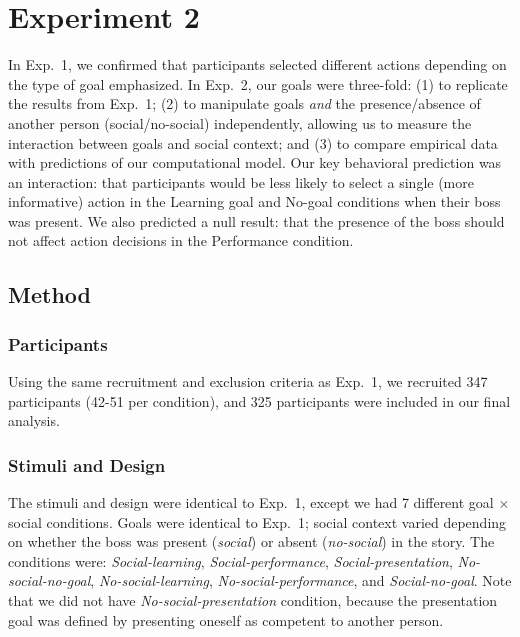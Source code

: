 \documentclass[10pt, letterpaper]{article}
\begin{document}
\section{Experiment 2}\label{experiment-2}

In Exp.~1, we confirmed that participants selected different actions
depending on the type of goal emphasized. In Exp.~2, our goals were
three-fold: (1) to replicate the results from Exp.~1; (2) to manipulate
goals \emph{and} the presence/absence of another person
(social/no-social) independently, allowing us to measure the interaction
between goals and social context; and (3) to compare empirical data with
predictions of our computational model. Our key behavioral prediction
was an interaction: that participants would be less likely to select a
single (more informative) action in the Learning goal and No-goal
conditions when their boss was present. We also predicted a null result:
that the presence of the boss should not affect action decisions in the
Performance condition.

\subsection{Method}\label{method-1}

\subsubsection{Participants}\label{participants-1}

Using the same recruitment and exclusion criteria as Exp.~1, we
recruited 347 participants (42-51 per condition), and 325 participants
were included in our final analysis.

\subsubsection{Stimuli and Design}\label{stimuli-and-design-1}

The stimuli and design were identical to Exp.~1, except we had 7
different goal \(\times\) social conditions. Goals were identical to
Exp.~1; social context varied depending on whether the boss was present
(\emph{social}) or absent (\emph{no-social}) in the story. The
conditions were: \emph{Social-learning}, \emph{Social-performance},
\emph{Social-presentation}, \emph{No-social-no-goal},
\emph{No-social-learning}, \emph{No-social-performance}, and
\emph{Social-no-goal}. Note that we did not have
\emph{No-social-presentation} condition, because the presentation goal
was defined by presenting oneself as competent to another person.
\end{document}
